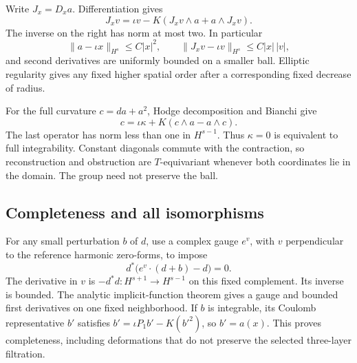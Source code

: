 \documentclass[11pt]{amsart}
\theoremstyle{definition}
\theoremstyle{remark}
\begin{document}
Write $J_x=D_xa$. Differentiation gives
\begin{equation}\label{eq:wall-derivative}
 J_xv=\iota v-K(J_xv\wedge a+a\wedge J_xv).
\end{equation}
The inverse on the right has norm at most two. In particular
\begin{equation}\label{eq:wall-reconstruction-bounds}
 \|a-\iota x\|_{H^s}\le C|x|^2,\qquad
 \|J_xv-\iota v\|_{H^s}\le C|x|\,|v|,
\end{equation}
and second derivatives are uniformly bounded on a smaller ball.
Elliptic regularity gives any fixed higher spatial order after a
corresponding fixed decrease of radius.

For the full curvature $c=da+a^2$, Hodge decomposition and Bianchi give
\begin{equation}\label{eq:wall-curvature-identity}
 c=\iota\kappa+K(c\wedge a-a\wedge c).
\end{equation}
The last operator has norm less than one in $H^{s-1}$. Thus
$\kappa=0$ is equivalent to full integrability. Constant diagonals
commute with the contraction, so reconstruction and obstruction are
$T$-equivariant whenever both coordinates lie in the domain.
The group need not preserve the ball.

\subsection{Completeness and all isomorphisms}
For any small perturbation $b$ of $d$, use a complex gauge $e^v$,
with $v$ perpendicular to the reference harmonic zero-forms, to impose
\[
 d^*\bigl(e^v\cdot(d+b)-d\bigr)=0.
\]
The derivative in $v$ is $-d^*d:H^{s+1}\to H^{s-1}$ on this
fixed complement. Its inverse is bounded. The analytic implicit-function
theorem gives a gauge and bounded first derivatives on one fixed
neighborhood. If $b$ is integrable, its Coulomb representative $b'$
satisfies $b'=\iota P_1b'-K(b'^2)$, so $b'=a(x)$.
This proves completeness, including deformations that do not preserve
the selected three-layer filtration.
\end{document}
